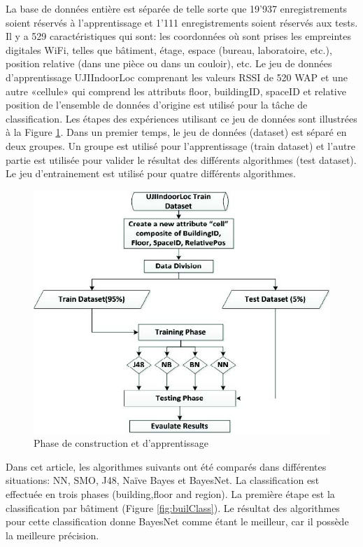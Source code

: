 La base de données entière est séparée de telle sorte que 19'937 enregistrements soient réservés à l'apprentissage et 1'111 enregistrements soient réservés aux tests. Il y a 529 caractéristiques qui sont: les coordonnées où sont prises les empreintes digitales WiFi, telles que bâtiment, étage, espace (bureau, laboratoire, etc.), position relative (dans une pièce ou dans un couloir), etc. Le jeu de données d'apprentissage UJIIndoorLoc comprenant les valeurs RSSI de 520 WAP et une autre «cellule» qui comprend les attributs floor, buildingID, spaceID et relative position de l'ensemble de données d'origine est utilisé pour la tâche de classification. Les étapes des expériences utilisant ce jeu de données sont illustrées à la Figure \ref{fig:newAttribute}. Dans un premier temps, le jeu de données (dataset) est séparé en deux groupes. Un groupe est utilisé pour l'apprentissage (train dataset) et l'autre partie est utilisée pour valider le résultat des différents algorithmes (test dataset). Le jeu d'entrainement est utilisé pour quatre différents algorithmes.

\begin{figure}[htp]
 \begin{center}
  \includegraphics[scale=0.7]{figures/newattribute.jpg}
  \caption{Phase de construction et d'apprentissage \cite{ML_algo}}
  \label{fig:newAttribute} %
 \end{center}
\end{figure}

Dans cet article, les algorithmes suivants ont été comparés dans différentes situations: NN, SMO, J48, Naïve Bayes et BayesNet. La classification est effectuée en trois phases (building,floor and region). La première étape est la classification par bâtiment (Figure \ref{fig:builClass}). Le résultat des algorithmes pour cette classification donne BayesNet comme étant le meilleur, car il possède la meilleure précision.

